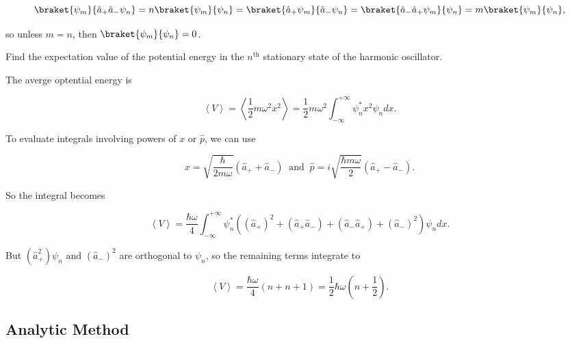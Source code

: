 \documentclass[a4paper,12pt]{report}
\begin{document}
\begin{equation}
  \braket{\psi _{m} }{\hat{a} _{+}\hat{a} _{-} \psi _{n}   } = n \braket{\psi _{m} }{\psi _{n} } = \braket{\hat{a} _{+} \psi _{m}  }{\hat{a} _{-} \psi _{n}  } = \braket{\hat{a} _{-} \hat{a} _{+} \psi _{m}  }{\psi _{n} } = m \braket{\psi _{m} }{\psi _{n} },     
\end{equation}

so unless \(m = n\), then \(\braket{\psi _{m} }{\psi _{n} } = 0 \).

{Find the expectation value of the potential energy in the \(n^{\text{th}} \) stationary state of the harmonic oscillator. }
{The averge optential energy is 

\begin{equation}
  \left \langle {V} \right \rangle = \left \langle {\frac{1}{2}m \omega ^2x^2 } \right \rangle = \frac{1}{2}m \omega ^2 \int_{-\infty}^{+\infty} \psi _{n}^* x^2 \psi _{n} dx.    
\end{equation}

To evaluate integrals involving powers of \(x \text { or } \hat{p}  \), we can use 

\begin{equation}
  x = \sqrt{\frac{\hbar }{2m \omega } } (\hat{a} _{+} + \hat{a} _{-}  ) ~\text { and }~ \hat{p} = i \sqrt{\frac{\hbar m \omega }{2} } (\hat{a} _{+} - \hat{a} _{-}  ). 
\end{equation}

So the integral becomes 

\begin{equation}
  \left \langle {V} \right \rangle = \frac{\hbar \omega }{4} \int_{-\infty}^{+\infty} \psi _{n}^* \left( \left( \hat{a} _{+}  \right)^2 + (\hat{a} _{+}\hat{a} _{-}  ) + (\hat{a} _{-}\hat{a} _{+}  ) + (\hat{a} _{-} )^2 \right) \psi _{n}dx.
\end{equation}

But \((\hat{a} _{+}^2 )\psi _{n} \text { and }  (\hat{a} _{-} )^2 \) are orthogonal to \(\psi _{n} \), so the remaining terms integrate to 

\begin{equation}
  \left \langle {V} \right \rangle = \frac{\hbar \omega }{4} (n + n + 1) = \frac{1}{2} \hbar \omega \left( n + \frac{1}{2}  \right) .
\end{equation}

} 

\subsection{Analytic Method}
\end{document}
